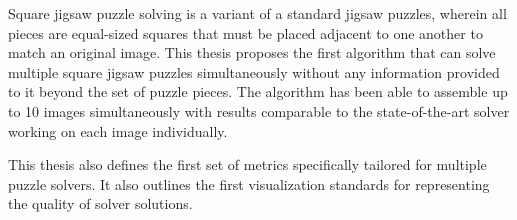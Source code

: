Square jigsaw puzzle solving is a variant of a standard jigsaw puzzles, wherein all pieces are equal-sized squares that must be placed adjacent to one another to match an original image.  This thesis proposes the first algorithm that can solve multiple square jigsaw puzzles simultaneously without any information provided to it beyond the set of puzzle pieces.  The algorithm has been able to assemble up to 10 images simultaneously with results comparable to the state-of-the-art solver working on each image individually.

This thesis also defines the first set of metrics specifically tailored for multiple puzzle solvers.  It also outlines the first visualization standards for representing the quality of solver solutions.
